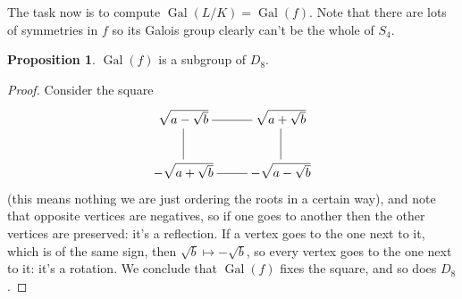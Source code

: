 \documentclass{article}
\newcommand{\Gal}{\operatorname{Gal}}
\theoremstyle{definition}
\newtheorem{prop}[defn]{Proposition}
\begin{document}
The task now is to compute $\Gal(L/K)=\Gal(f)$. Note that there are lots of symmetries in $f$ so its Galois group clearly can't be the whole of $S_4$.

\begin{prop}
\label{prop:GalofbiqissgofD8}
$\Gal(f)$ is a subgroup of $D_8$.
\end{prop}
\begin{proof}
Consider the square
\[
\xymatrix{
\sqrt{a-\sqrt b}\ar@{-}[r]\ar@{-}[d] & \sqrt{a+\sqrt b} \ar@{-}[d] \\
-\sqrt{a+\sqrt b}\ar@{-}[r]& -\sqrt{a-\sqrt b}
}
\]
(this means nothing we are just ordering the roots in a certain way), and note that opposite vertices are negatives, so if one goes to another then the other vertices are preserved: it's a reflection. If a vertex goes to the one next to it, which is of the same sign, then $\sqrt b\mapsto -\sqrt b$, so every vertex goes to the one next to it: it's a rotation. We conclude that $\Gal(f)$ fixes the square, and so does $D_8$.
\end{proof}
\end{document}
